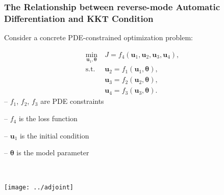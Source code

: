 \documentclass{beamer}
\newcommand{\bt}[0]{\bm{\theta}}
\newcommand{\bu}{\mathbf{u}}
\begin{document}
\begin{frame}
	\frametitle{The  Relationship between reverse-mode Automatic Differentiation and KKT Condition}
	Consider a concrete PDE-constrained optimization problem:
	
	\begin{minipage}[b]{0.45\textwidth}
		\begin{align*}
     \min_{\mathbf{u}_1, \bm{\theta}} &\  J = f_4(\mathbf{u}_1, \mathbf{u}_2, \mathbf{u}_3, \mathbf{u}_4), \\
     \mathrm{s.t.} & \ \mathbf{u}_2 = f_1(\mathbf{u}_1, \bm {\theta}), \\
     & \ \mathbf{u}_3 = f_2(\mathbf{u}_2, \bm {\theta}),\\
     & \  \mathbf{u}_4 = f_3(\mathbf{u}_3, \bm {\theta}).
\end{align*}
-- $f_1$, $f_2$, $f_3$ are PDE constraints

-- $f_4$ is the loss function

-- $\bu_1$ is the initial condition

-- $\bt$ is the model parameter
	\end{minipage}~
	\begin{minipage}[b]{0.45\textwidth}
		\texttt{[image: ../adjoint]}
	\end{minipage}
	 
	
	
	
	\end{frame}
	
\end{document}
